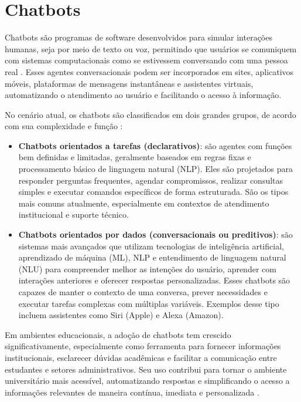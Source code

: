 \section{Chatbots}

Chatbots são programas de software desenvolvidos para simular interações humanas, seja por meio de texto ou voz, permitindo que usuários se comuniquem com sistemas computacionais como se estivessem conversando com uma pessoa real \cite{rouse2018chatbot,aws2025chatbot}. Esses agentes conversacionais podem ser incorporados em sites, aplicativos móveis, plataformas de mensagens instantâneas e assistentes virtuais, automatizando o atendimento ao usuário e facilitando o acesso à informação.

No cenário atual, os chatbots são classificados em dois grandes grupos, de acordo com sua complexidade e função \cite{oracle2025chatbot}:

\begin{itemize}
    \item \textbf{Chatbots orientados a tarefas (declarativos)}: são agentes com funções bem definidas e limitadas, geralmente baseados em regras fixas e processamento básico de linguagem natural (NLP). Eles são projetados para responder perguntas frequentes, agendar compromissos, realizar consultas simples e executar comandos específicos de forma estruturada. São os tipos mais comuns atualmente, especialmente em contextos de atendimento institucional e suporte técnico.
    \item \textbf{Chatbots orientados por dados (conversacionais ou preditivos)}: são sistemas mais avançados que utilizam tecnologias de inteligência artificial, aprendizado de máquina (ML), NLP e entendimento de linguagem natural (NLU) para compreender melhor as intenções do usuário, aprender com interações anteriores e oferecer respostas personalizadas. Esses chatbots são capazes de manter o contexto de uma conversa, prever necessidades e executar tarefas complexas com múltiplas variáveis. Exemplos desse tipo incluem assistentes como Siri (Apple) e Alexa (Amazon).
\end{itemize}

Em ambientes educacionais, a adoção de chatbots tem crescido significativamente, especialmente como ferramenta para fornecer informações institucionais, esclarecer dúvidas acadêmicas e facilitar a comunicação entre estudantes e setores administrativos. Seu uso contribui para tornar o ambiente universitário mais acessível, automatizando respostas e simplificando o acesso a informações relevantes de maneira contínua, imediata e personalizada \cite{dykeland2018unleashing}.

